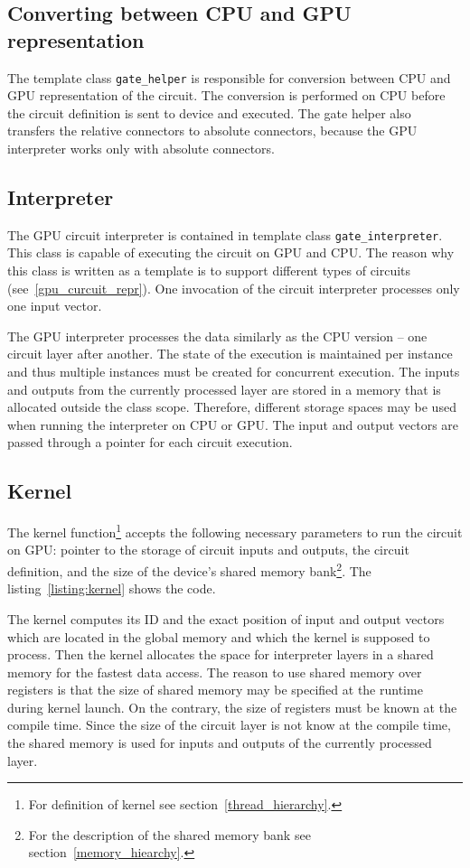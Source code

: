 \documentclass[12pt,oneside]{fithesis2}
\begin{document}
\subsection{Converting between CPU and GPU representation}

The template class \texttt{gate\_helper} is responsible for conversion between CPU and GPU representation of the circuit. The conversion is performed on CPU before the circuit definition is sent to device and executed. The gate helper also transfers the relative connectors to absolute connectors, because the GPU interpreter works only with absolute connectors.

\subsection{Interpreter}

The GPU circuit interpreter is contained in template class \texttt{gate\_interpreter}. This class is capable of executing the circuit on GPU and CPU. The reason why this class is written as a template is to support different types of circuits (see~\ref{gpu_curcuit_repr}). One invocation of the circuit interpreter processes only one input vector.

The GPU interpreter processes the data similarly as the CPU version -- one circuit layer after another. The state of the execution is maintained per instance and thus multiple instances must be created for concurrent execution. The inputs and outputs from the currently processed layer are stored in a memory that is allocated outside the class scope. Therefore, different storage spaces may be used when running the interpreter on CPU or GPU. The input and output vectors are passed through a pointer for each circuit execution.

\subsection{Kernel}

The kernel function\footnote{For definition of kernel see section~\ref{thread_hierarchy}.} accepts the following necessary parameters to run the circuit on GPU: pointer to the storage of circuit inputs and outputs, the circuit definition, and the size of the device's shared memory bank\footnote{For the description of the shared memory bank see section~\ref{memory_hiearchy}.}. The listing~\ref{listing:kernel} shows the code.

The kernel computes its ID and the exact position of input and output vectors which are located in the global memory and which the kernel is supposed to process. Then the kernel allocates the space for interpreter layers in a shared memory for the fastest data access. The reason to use shared memory over registers is that the size of shared memory may be specified at the runtime during kernel launch. On the contrary, the size of registers must be known at the compile time. Since the size of the circuit layer is not know at the compile time, the shared memory is used for inputs and outputs of the currently processed layer.
\end{document}
